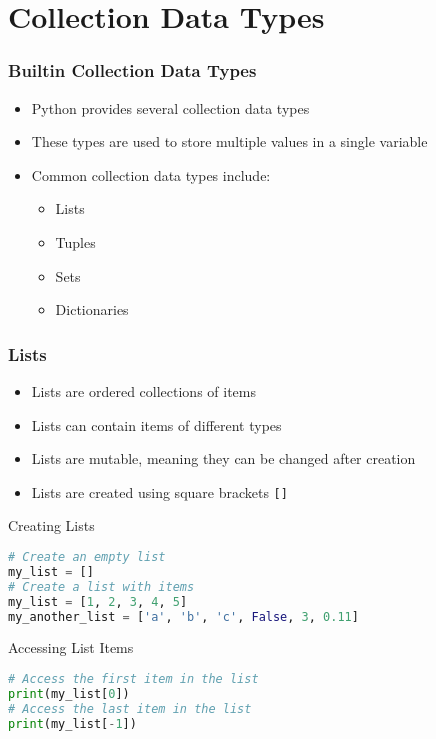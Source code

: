 \section{Collection Data Types}
\begin{frame}
    \frametitle{Builtin Collection Data Types}
    \begin{itemize}
        \item Python provides several collection data types
        \item These types are used to store multiple values in a single variable
        \item Common collection data types include:
        \begin{itemize}
            \item Lists
            \item Tuples
            \item Sets
            \item Dictionaries
        \end{itemize}
    \end{itemize}   
\end{frame}

\begin{frame}
    \frametitle{Lists}
    \begin{itemize}
        \item Lists are ordered collections of items
        \item Lists can contain items of different types
        \item Lists are mutable, meaning they can be changed after creation
        \item Lists are created using square brackets \texttt{[]}
    \end{itemize}
\end{frame}

\begin{frame}[fragile]{Creating Lists}
    \begin{lstlisting}[style=colorful, language=Python]
# Create an empty list
my_list = []
# Create a list with items
my_list = [1, 2, 3, 4, 5]  
my_another_list = ['a', 'b', 'c', False, 3, 0.11]  
    \end{lstlisting}
\end{frame}

\begin{frame}[fragile]{Accessing List Items}
    \begin{lstlisting}[style=colorful, language=Python]
# Access the first item in the list
print(my_list[0])
# Access the last item in the list
print(my_list[-1])
    \end{lstlisting}
\end{frame} 

